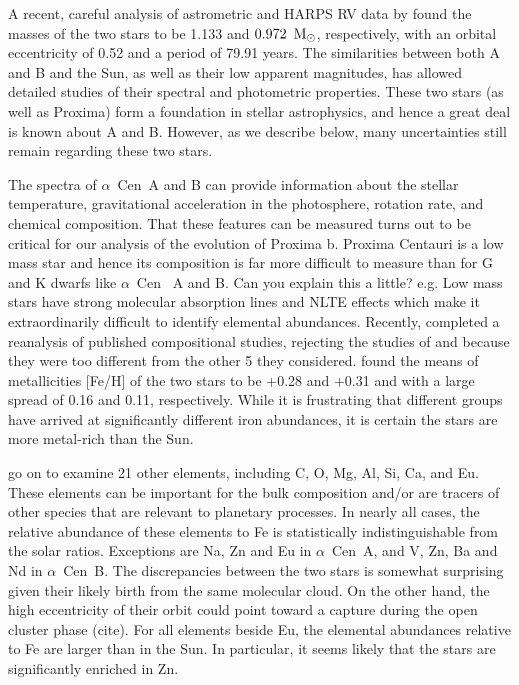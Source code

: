 \documentclass[preprint,12pt]{aastex}
\newcommand{\xxx}[1]{{\color{red} #1}} %
\def\msun{{\rm\,M_\odot}}
\def\acen{{$\alpha$~Cen}}
\begin{document}
A recent, careful analysis of astrometric and HARPS RV data by
\cite{PourbaixBoffin16} found the masses of the two stars to be 1.133
and $0.972~\msun$, respectively, with an orbital eccentricity of 0.52
and a period of 79.91 years. The similarities between both A and B and
the Sun, as well as their low apparent magnitudes, has allowed
detailed studies of their spectral and photometric properties. These
two stars (as well as Proxima) form a foundation in stellar astrophysics,
and hence a great deal is known about A and B. However, as we describe
below, many uncertainties still remain regarding these two stars.

The spectra of \acen~A and B can provide information about the stellar
temperature, gravitational acceleration in the photosphere, rotation
rate, and \xxx{chemical} composition. That these features can be measured turns out
to be critical for our analysis of the evolution of Proxima b. Proxima
Centauri is a low mass star and hence its composition is far more
difficult to measure than for G and K dwarfs like \acen~ A and
B. \xxx{Can you explain this a little? e.g. Low mass stars have strong molecular absorption lines 
and NLTE effects which make it extraordinarily difficult to identify elemental abundances}. 
Recently, \cite{HinkelKane13} completed a reanalysis of published
compositional studies, rejecting the studies of \cite{Laird85} and
\cite{NeuforgeMagain97} because they were too different from the
other 5 they \xxx{considered.  \cite{HinkelKane13} found} the means of metallicities [Fe/H]
of the two stars to be +0.28 and +0.31 and with a large spread of 0.16
and 0.11, respectively. While it is frustrating that different groups
have arrived at significantly different iron abundances, it is certain
the stars are more metal-rich than the Sun. 

\cite{HinkelKane13} go on to examine 21 other elements, including C,
O, Mg, Al, Si, Ca, and Eu. These elements can be important for the
bulk composition and/or are tracers of other species that are relevant
to planetary processes. In nearly all cases, the relative abundance of
these elements to Fe is statistically indistinguishable from the solar
ratios. Exceptions are Na, Zn and Eu in \acen~A, and V, Zn, Ba
and Nd in \acen~B. The discrepancies between the two stars is
somewhat surprising given their likely birth from the same molecular
cloud. On the other hand, the high eccentricity of their orbit could
point toward a capture during the open cluster phase \xxx{(cite)}. For all
elements beside Eu, the elemental abundances relative to Fe are larger
than in the Sun. In particular, it seems likely that the stars are
significantly enriched in Zn.
\end{document}

